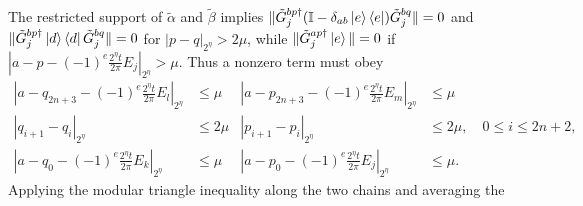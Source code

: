 \documentclass[aps,floatfix,10pt,amssymb,amsfont,amsmath,superscriptaddress,float,nofootinbib,longbibliography,nobalancelastpage,twocolumn]{revtex4-2}
\begin{document}
\begin{widetext}
The restricted support of $\tilde\alpha$ and $\tilde\beta$ implies
$\|\tilde G^{bp\dagger}_{j}(\mathbb{I} - \delta_{ab}\ket{e}\bra{e})\tilde G^{bq}_{j}\| = 0$ and
$\|\tilde G^{bp\dagger}_{j}\ket{d}\bra{d}\tilde G^{bq}_{j}\| = 0$
for $|p-q|_{2^{\eta}} > 2\mu$, while
$\|\tilde G^{ap \dagger}_j \ket{e}\| = 0$ if
$|a-p-(-1)^e\frac{2^{\eta}t}{2\pi}E_j|_{2^\eta}>\mu$.  Thus a nonzero
term must obey
\begin{equation}
\begin{aligned}
    |a-q_{2n+3}-(-1)^e\tfrac{2^{\eta}t}{2\pi}E_l|_{2^{\eta}} &\leq \mu
    &|a-p_{2n+3}-(-1)^e\tfrac{2^{\eta}t}{2\pi}E_m|_{2^{\eta}} &\leq \mu\\
    |q_{i+1}-q_i|_{2^{\eta}} &\leq 2\mu
    &|p_{i+1}-p_i|_{2^{\eta}} &\leq 2\mu,\quad 0\leq i\leq2n+2,\\
    |a-q_0-(-1)^{e}\tfrac{2^{\eta}t}{2\pi}E_k|_{2^{\eta}} &\leq \mu
    &|a-p_0-(-1)^{e}\tfrac{2^{\eta}t}{2\pi}E_j|_{2^{\eta}}& \leq \mu.
\end{aligned}
\end{equation}
Applying the modular triangle inequality along the two chains and averaging the

\end{widetext}
\end{document}

